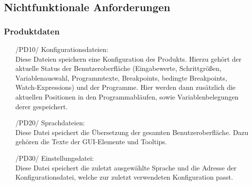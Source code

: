 \documentclass[parskip=full]{scrartcl}
\begin{document}
	\subsection{Nichtfunktionale Anforderungen}
		\subsubsection{Produktdaten}
		\begin{itemize}
		
		
			\item[/PD10/] Konfigurationsdateien: \\
			Diese Dateien speichern eine Konfiguration des Produkts. 
			Hierzu gehört der aktuelle Status der Benutzeroberfläche (Eingabewerte, Schrittgrößen, Variablenauswahl, Programmtexte, Breakpoints, bedingte Breakpoints, Watch-Expressions) und der Programme.
			Hier werden dann zusätzlich die aktuellen Positionen in den Programmabläufen, sowie Variablenbelegungen derer gespeichert.
			
			\item[/PD20/] Sprachdateien: \\
			Diese Datei speichert die Übersetzung der gesamten Benutzeroberfläche.
			Dazu gehören die Texte der GUI-Elemente und \glspl{Tooltip}.
			
			\item[/PD30/] Einstellungsdatei: \\
			Diese Datei speichert die zuletzt ausgewählte Sprache und die Adresse der \gls{Konfigurationsdatei}, welche zur zuletzt verwendeten Konfiguration passt.  
			\end{itemize}
			
			 
\end{document}
